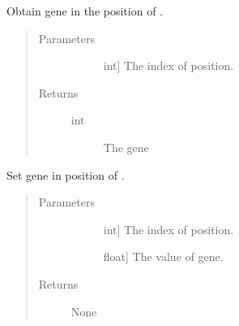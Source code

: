 \documentclass[letterpaper,10pt,english]{sphinxmanual}
\begin{document}
\begin{fulllineitems}
\begin{fulllineitems}
\label{\detokenize{pygace:pygace.ga.Cromosome.get_gene}}
\sphinxAtStartPar
Obtain gene in the position of .
\begin{quote}\begin{description}
\item[{Parameters}] \leavevmode\begin{description}
\item[{}] \leavevmode{[}int{]}
\sphinxAtStartPar
The index of position.

\end{description}

\item[{Returns}] \leavevmode\begin{description}
\item[{int}] \leavevmode
\sphinxAtStartPar
The gene

\end{description}

\end{description}\end{quote}

\end{fulllineitems}


\begin{fulllineitems}
\label{\detokenize{pygace:pygace.ga.Cromosome.set_gene}}
\sphinxAtStartPar
Set gene in position of .
\begin{quote}\begin{description}
\item[{Parameters}] \leavevmode\begin{description}
\item[{}] \leavevmode{[}int{]}
\sphinxAtStartPar
The index of position.

\item[{}] \leavevmode{[}float{]}
\sphinxAtStartPar
The value of gene.

\end{description}

\item[{Returns}] \leavevmode\begin{description}
\item[{None}] \leavevmode
\end{description}


\end{description}
\end{quote}
\end{fulllineitems}
\end{fulllineitems}
\end{document}
